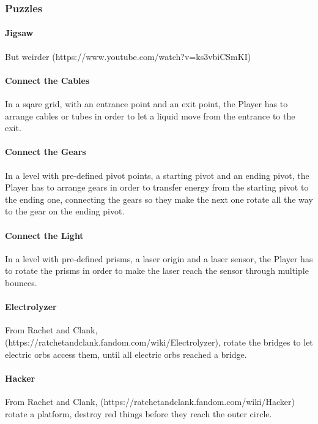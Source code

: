 \subsubsection{Puzzles}

\paragraph{Jigsaw} But weirder (https://www.youtube.com/watch?v=ks3vbiCSmKI)

\paragraph{Connect the Cables} In a sqare grid, with an entrance point and an exit point, the Player has to arrange cables or tubes in order to let a liquid move from the entrance to the exit.

\paragraph{Connect the Gears} In a level with pre-defined pivot points, a starting pivot and an ending pivot, the Player has to arrange gears in order to transfer energy from the starting pivot to the ending one, connecting the gears so they make the next one rotate all the way to the gear on the ending pivot.

\paragraph{Connect the Light} In a level with pre-defined prisms, a laser origin and a laser sensor, the Player has to rotate the prisms in order to make the laser reach the sensor through multiple bounces.

\paragraph{Electrolyzer} From Rachet and Clank, (https://ratchetandclank.fandom.com/wiki/Electrolyzer), rotate the bridges to let electric orbs access them, until all electric orbs reached a bridge.


\paragraph{Hacker} From Rachet and Clank, (https://ratchetandclank.fandom.com/wiki/Hacker) rotate a platform, destroy red things before they reach the outer circle.

